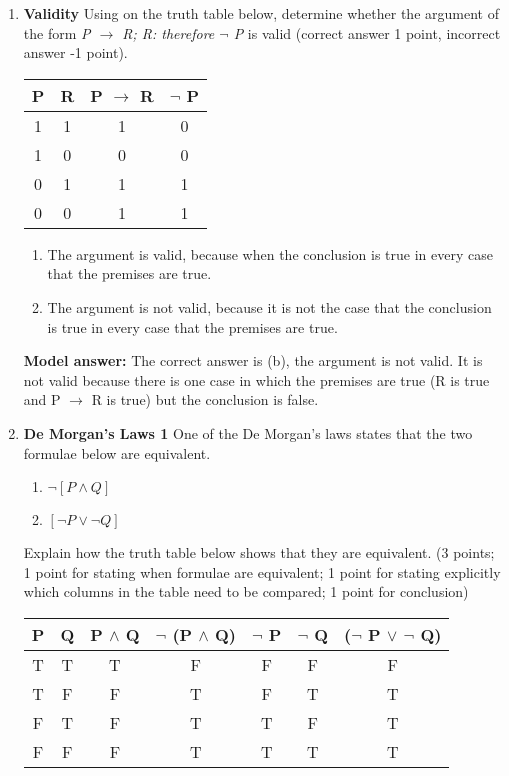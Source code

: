 \documentclass[a4,11pt]{article}
\begin{document}
\begin{enumerate}[leftmargin = 12pt]
 
\item {\bf Validity} Using on the truth table below, determine whether the argument of the form \textit{ P $\to$ R; R: therefore $\neg$ P} is valid (correct answer 1 point, incorrect answer -1 point).


\begin{tabular}{c | c | c| c }
\hline \hline
P & R & P $\to$ R  & $\neg$ P \\
\hline
1 & 1 & 1 & 0 \\
1 & 0 & 0 & 0 \\
0 & 1 & 1 & 1 \\
0 & 0 & 1 & 1 \\
\hline \hline
\end{tabular}

\begin{enumerate}
\item The argument is valid, because when the conclusion is true in every case that the premises are true.
\item The argument is not valid, because it is not the case that the conclusion is true in every case that the premises are true.
\end{enumerate}

{ \bf Model answer:}  The correct answer is (b), the argument is not valid. It is not valid because there is one case in which the premises are true (R is true and P $\to$ R is true) but the conclusion is false.


\item {\bf De Morgan's Laws 1} One of the De Morgan's laws states that the two formulae below are equivalent. 

\begin{enumerate}
\item  $\neg [ P \land  Q ]$
\item  $ [ \neg P \lor \neg Q ]$
\end{enumerate}

Explain how the truth table below shows that they are equivalent. (3 points; 1 point for stating when formulae are equivalent; 1 point for stating explicitly which columns in the table need to be compared; 1 point for conclusion)

\begin{tabular}{c | c | c | c | c | c | c}
\hline \hline
P & Q & P $\land$ Q & $\neg$ (P $\land$ Q) & $\neg$ P & $\neg$ Q & ($\neg$ P $\lor$ $\neg$ Q) \\
\hline \hline
T & T & T  & F & F & F & F\\
T & F & F & T & F & T & T\\
F & T & F& T & T & F & T\\
F & F & F& T& T & T & T\\
\hline \hline



\end{tabular}
\end{enumerate}
\end{document}
